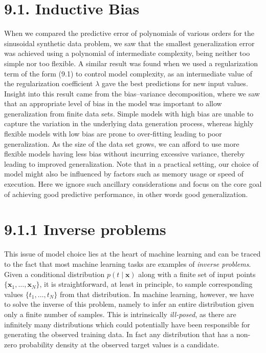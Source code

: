 \documentclass{article}
\begin{document}
\section{9.1. Inductive Bias}

When we compared the predictive error of polynomials of various orders for the sinusoidal synthetic data problem, we saw that the smallest generalization error was achieved using a polynomial of intermediate complexity, being neither too simple nor too flexible. A similar result was found when we used a regularization term of the form (9.1) to control model complexity, as an intermediate value of the regularization coefficient $\lambda$ gave the best predictions for new input values. Insight into this result came from the bias--variance decomposition, where we saw that an appropriate level of bias in the model was important to allow generalization from finite data sets. Simple models with high bias are unable to capture the variation in the underlying data generation process, whereas highly flexible models with low bias are prone to over-fitting leading to poor generalization. As the size of the data set grows, we can afford to use more flexible models having less bias without incurring excessive variance, thereby leading to improved generalization. Note that in a practical setting, our choice of model might also be influenced by factors such as memory usage or speed of execution. Here we ignore such ancillary considerations and focus on the core goal of achieving good predictive performance, in other words good generalization.

\section{9.1.1 Inverse problems}

This issue of model choice lies at the heart of machine learning and can be traced to the fact that most machine learning tasks are examples of \emph{inverse problems}. Given a conditional distribution $p(t \mid \mathbf{x})$ along with a finite set of input points $\{\mathbf{x}_1,\dots,\mathbf{x}_N\}$, it is straightforward, at least in principle, to sample corresponding values $\{t_1,\dots,t_N\}$ from that distribution. In machine learning, however, we have to solve the inverse of this problem, namely to infer an entire distribution given only a finite number of samples. This is intrinsically \emph{ill-posed}, as there are infinitely many distributions which could potentially have been responsible for generating the observed training data. In fact any distribution that has a non-zero probability density at the observed target values is a candidate.
\end{document}
